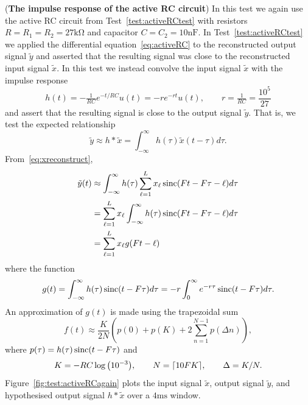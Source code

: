 \begin{test}\label{test:activeRCtestagain} 
(\textbf{The impulse response of the active RC circuit})
In this test we again use the active RC circuit from Test~\ref{test:activeRCtest} with resistors $R=R_1=R_2=27\si{\kilo\ohm}$ and capacitor $C=C_2=10\si{\nano\farad}$.  In Test~\ref{test:activeRCtest} we applied the differential equation~\eqref{eq:activeRC} to the reconstructed output signal $\tilde{y}$ and asserted that the resulting signal was close to the reconstructed input signal $\tilde{x}$.  In this test we instead convolve the input signal $\tilde{x}$ with the impulse response 
\[
h(t) = -\tfrac{1}{RC} e^{-t/RC}u(t) = -r e^{-rt}u(t), \qquad r = \tfrac{1}{RC} = \frac{10^5}{27}
\] 
and assert that the resulting signal is close to the output signal $\tilde{y}$.  That is, we test the expected relationship
\[
\tilde{y} \approx h * \tilde{x} = \int_{-\infty}^\infty h(\tau) \tilde{x}(t - \tau) d\tau.
\]
From~\eqref{eq:xreconstruct},
\begin{align*}
\tilde{y}(t) &\approx  \int_{-\infty}^{\infty} h(\tau) \sum_{\ell=1}^L x_\ell \operatorname{sinc}( Ft - F\tau - \ell ) d\tau \\
&= \sum_{\ell=1}^L  x_\ell \int_{-\infty}^{\infty} h(\tau) \operatorname{sinc}( Ft - F\tau - \ell ) d\tau \\
&= \sum_{\ell=1}^L  x_\ell g( Ft - \ell )
\end{align*}
where the function
\[
g(t) = \int_{-\infty}^\infty h(\tau) \operatorname{sinc}( t - F\tau ) d\tau = -r \int_{0}^\infty e^{-r\tau} \operatorname{sinc}( t - F\tau ) d\tau.
\]
An approximation of $g(t)$ is made using the trapezoidal sum
\[
f(t) \approx \frac{K}{2N} \left( p(0) + p(K) + 2 \sum_{n=1}^{N-1} p( \Delta n ) \right),
\]
where $p(\tau) = h(\tau) \operatorname{sinc}( t - F\tau )$ and
\[
K = -RC\log\big(10^{-3}\big), \qquad N = \lceil 10 F K \rceil, \qquad \Delta = K/N.
\]
Figure~\ref{fig:test:activeRCagain} plots the input signal $\tilde{x}$, output signal $\tilde{y}$, and hypothesised output signal $h * \tilde{x}$ over a $4\si{\milli\second}$ window.


\end{test}
